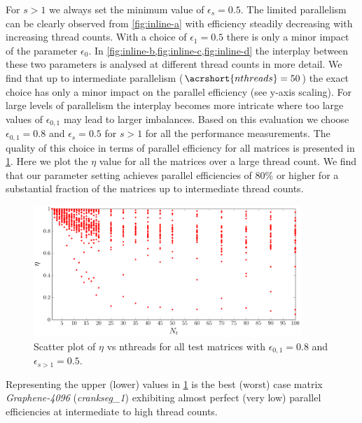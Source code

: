 %
For $s > 1$ we always set the minimum value of $\epsilon_s=0.5$. The limited parallelism can be clearly observed from \cref{fig:inline-a}  with efficiency steadily decreasing with increasing thread counts. With a choice of $\epsilon_1=0.5$ there is only a minor impact of the parameter $\epsilon_0$. In \cref{fig:inline-b,fig:inline-c,fig:inline-d} the interplay between these two parameters is analysed at different thread counts in more detail. We find that up to intermediate parallelism ($\acrshort{nthreads}=50$) the exact choice has only a minor impact on the parallel efficiency (see y-axis scaling). For large levels of parallelism the interplay becomes more intricate where too large values of $\epsilon_{0,1}$ may lead to larger imbalances. Based on this evaluation we choose $\epsilon_{0,1}=0.8$ and $\epsilon_s=0.5$ for $s>1$ for all the performance measurements. The quality of this choice in terms of parallel efficiency for all matrices is presented in \cref{fig:param_all_mtx_stat}. Here we plot the $\eta$ value for all the matrices over a large thread count. We find that our parameter setting achieves parallel efficiencies of 80\% or higher for a substantial fraction of the matrices up to intermediate thread counts. 
   \begin{figure}[tbhp]
   	\centering
   	\includegraphics[height=0.19\textheight,width=0.9\textwidth]{pics/param_study/scatter_plot}
   	\caption{Scatter plot of $\eta$ vs \acrshort{nthreads} for all test matrices with $\epsilon_{0,1} = 0.8$ and $\epsilon_{s>1} = 0.5$.}
  	\label{fig:param_all_mtx_stat}
   \end{figure}
Representing the upper (lower) values in \cref{fig:param_all_mtx_stat} is the best (worst) case matrix \emph{Graphene-4096} (\emph{crankseg\_1}) exhibiting almost perfect (very low) parallel efficiencies at intermediate to high thread counts.

